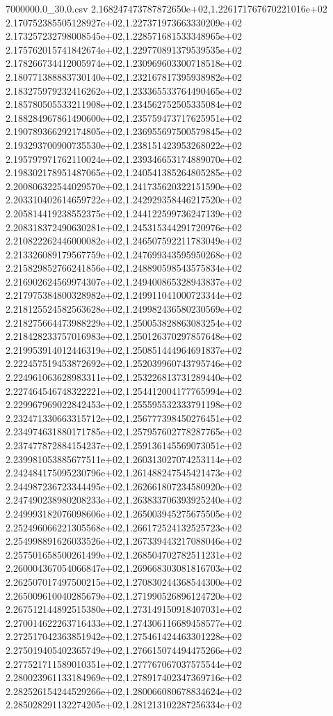 \begin{filecontents*}{7000000.0_30.0.csv}
2.168247473787872650e+02,1.226171767670221016e+02
2.170752385505128927e+02,1.227371973663330209e+02
2.173257232798008545e+02,1.228571681533348965e+02
2.175762015741842674e+02,1.229770891379539535e+02
2.178266734412005974e+02,1.230969603300718518e+02
2.180771388883730140e+02,1.232167817395938982e+02
2.183275979232416262e+02,1.233365533764490465e+02
2.185780505533211908e+02,1.234562752505335084e+02
2.188284967861490600e+02,1.235759473717625951e+02
2.190789366292174805e+02,1.236955697500579845e+02
2.193293700900735530e+02,1.238151423953268022e+02
2.195797971762110024e+02,1.239346653174889070e+02
2.198302178951487065e+02,1.240541385264805285e+02
2.200806322544029570e+02,1.241735620322151590e+02
2.203310402614659722e+02,1.242929358446217520e+02
2.205814419238552375e+02,1.244122599736247139e+02
2.208318372490630281e+02,1.245315344291720976e+02
2.210822262446000082e+02,1.246507592211783049e+02
2.213326089179567759e+02,1.247699343595950268e+02
2.215829852766241856e+02,1.248890598543575834e+02
2.216902624569974307e+02,1.249400865328943837e+02
2.217975384800328982e+02,1.249911041000723344e+02
2.218125524582563628e+02,1.249982436580230569e+02
2.218275664473988229e+02,1.250053828863083254e+02
2.218428233757016983e+02,1.250126370297857648e+02
2.219953914012446319e+02,1.250851444964691837e+02
2.222457519453872692e+02,1.252039960743795746e+02
2.224961063628983311e+02,1.253226813731289440e+02
2.227464546748322221e+02,1.254412004177765994e+02
2.229967969022842453e+02,1.255595532333791198e+02
2.232471330663315712e+02,1.256777398450276451e+02
2.234974631880171785e+02,1.257957602778287765e+02
2.237477872884154237e+02,1.259136145569073051e+02
2.239981053885677511e+02,1.260313027074253114e+02
2.242484175095230796e+02,1.261488247545421473e+02
2.244987236723344495e+02,1.262661807234580920e+02
2.247490238980208233e+02,1.263833706393925240e+02
2.249993182076098606e+02,1.265003945275675505e+02
2.252496066221305568e+02,1.266172524132525723e+02
2.254998891626033526e+02,1.267339443217088046e+02
2.257501658500261499e+02,1.268504702782511231e+02
2.260004367054066847e+02,1.269668303081816703e+02
2.262507017497500215e+02,1.270830244368544300e+02
2.265009610040285679e+02,1.271990526896124720e+02
2.267512144892515380e+02,1.273149150918407031e+02
2.270014622263716433e+02,1.274306116689458577e+02
2.272517042363851942e+02,1.275461424463301228e+02
2.275019405402365749e+02,1.276615074494475266e+02
2.277521711589010351e+02,1.277767067037575544e+02
2.280023961133184969e+02,1.278917402347369716e+02
2.282526154244529266e+02,1.280066080678834624e+02
2.285028291132274205e+02,1.281213102287256334e+02

\end{filecontents*}
